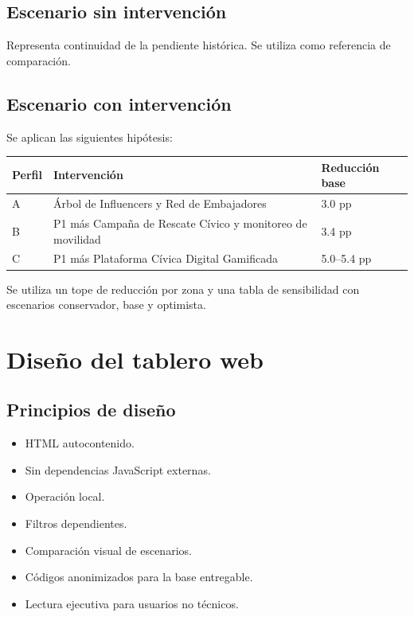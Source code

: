 \documentclass[11pt,a4paper]{article}
\begin{document}
\subsection{Escenario sin intervención}

Representa continuidad de la pendiente histórica. Se utiliza como referencia de comparación.

\subsection{Escenario con intervención}

Se aplican las siguientes hipótesis:

\begin{longtable}{p{}p{}p{}}
\toprule
\textbf{Perfil} & \textbf{Intervención} & \textbf{Reducción base}\\
\midrule
A & Árbol de Influencers y Red de Embajadores & 3.0 pp\\
B & P1 más Campaña de Rescate Cívico y monitoreo de movilidad & 3.4 pp\\
C & P1 más Plataforma Cívica Digital Gamificada & 5.0--5.4 pp\\
\bottomrule
\end{longtable}

Se utiliza un tope de reducción por zona y una tabla de sensibilidad con escenarios conservador, base y optimista.

\section{Diseño del tablero web}

\subsection{Principios de diseño}

\begin{itemize}
    \item HTML autocontenido.
    \item Sin dependencias JavaScript externas.
    \item Operación local.
    \item Filtros dependientes.
    \item Comparación visual de escenarios.
    \item Códigos anonimizados para la base entregable.
    \item Lectura ejecutiva para usuarios no técnicos.
\end{itemize}
\end{document}

